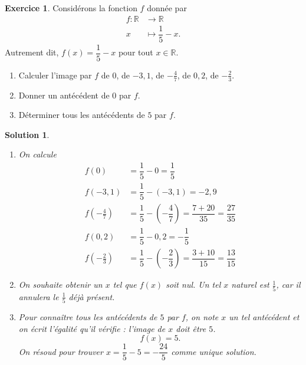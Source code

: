 \documentclass[a4paper, 14pt]{extarticle}
\theoremstyle{plain}
\newtheorem*{sol}{Solution}
\theoremstyle{definition}
\newtheorem{ex}{Exercice}
\newcommand{\R}{\mathbb{R}}
\newcommand{\exe}[2]{
		\begin{ex} #1  \end{ex}
		\begin{sol} #2 \end{sol}
	}
\newcommand{\exe}[2]{
		\begin{ex} #1  \end{ex}
	}
\begin{document}
	\exe{
		Considérons la fonction $f$ donnée par
		\begin{align*}
			f: \R & \longrightarrow \R \\
			x& \longmapsto \dfrac15-x.
		\end{align*}
		Autrement dit, $f(x) = \dfrac15-x$ pour tout $x\in\R$.
		
		\begin{enumerate}
			\item
			Calculer l'image par $f$ de $0$, de $-3,1$, de $-\frac47$, de $0,2$, de $-\frac23$.
			\item
			Donner un antécédent de $0$ par $f$.
			\item
			Déterminer tous les antécédents de $5$ par $f$.	
		\end{enumerate}
	}{
		\begin{enumerate}
			\item
			On calcule
				\begin{align*}
					f(0) &= \dfrac15 - 0 = \dfrac15 \\
					f(-3,1) &= \dfrac15 - (-3,1) = -2,9 \\
					f\left(-\frac47\right) &= \dfrac15 - (-\dfrac47) = \dfrac{7 + 20}{35} = \dfrac{27}{35} \\
					f(0,2) &= \dfrac15 - 0,2 = -\dfrac15 \\
					f\left( -\frac23 \right) &= \dfrac15 - (-\dfrac23) = \dfrac{3 + 10}{15} = \dfrac{13}{15}
				\end{align*}
			\item
			On souhaite obtenir un $x$ tel que $f(x)$ soit nul. Un tel $x$ naturel est $\frac15$, car il annulera le $\frac15$ déjà présent.
			\item
			Pour connaître tous les antécédents de $5$ par $f$, on note $x$ un tel antécédent et on écrit l'égalité qu'il vérifie : l'image de $x$ doit être $5$.
				\[ f(x) = 5. \]
			On résoud pour trouver $x = \dfrac15 - 5 =  -\dfrac{24}{5}$ comme unique solution.
		\end{enumerate}
	
	
	}
	
\end{document}
